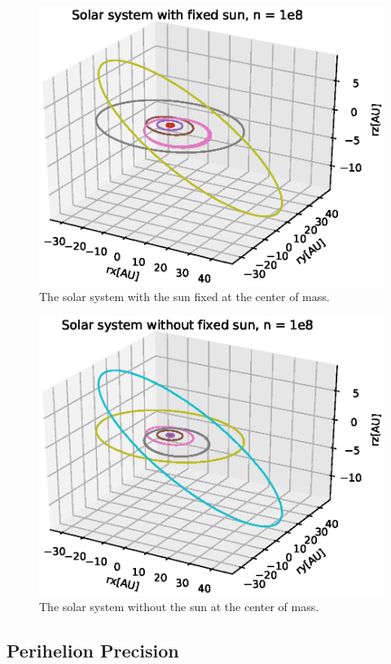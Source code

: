 \documentclass{article}
\begin{document}
\begin{figure}[H]
  \includegraphics[scale=0.7]{plots/FixedSolarSystem.eps}
  \caption{The solar system with the sun fixed at the center of mass.}
  \label{fixedsolarsystem}
\end{figure}

\begin{figure}
  \includegraphics[scale=0.7]{plots/SolarSystem.eps}
  \caption{The solar system without the sun at the center of mass.}
  \label{solarsystem}
\end{figure}


\subsection{Perihelion Precision}
\end{document}
